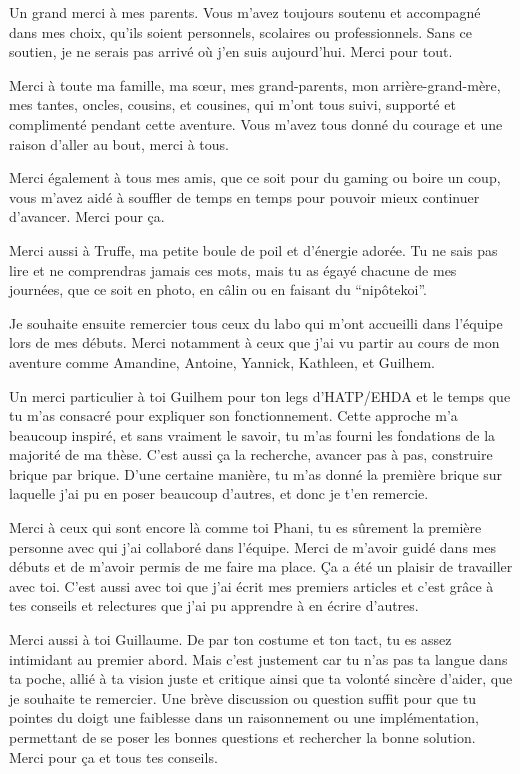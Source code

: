
Un grand merci à mes parents. Vous m'avez toujours soutenu et accompagné dans mes choix, qu'ils soient personnels, scolaires ou professionnels. Sans ce soutien, je ne serais pas arrivé où j'en suis aujourd'hui. Merci pour tout.

Merci à toute ma famille, ma sœur, mes grand-parents, mon arrière-grand-mère, mes tantes, oncles, cousins, et cousines, qui m'ont tous suivi, supporté et complimenté pendant cette aventure. Vous m'avez tous donné du courage et une raison d'aller au bout, merci à tous.

Merci également à tous mes amis, que ce soit pour du gaming ou boire un coup, vous m'avez aidé à souffler de temps en temps pour pouvoir mieux continuer d'avancer. Merci pour ça.



Merci aussi à Truffe, ma petite boule de poil et d'énergie adorée. Tu ne sais pas lire et ne comprendras jamais ces mots, mais tu as égayé chacune de mes journées, que ce soit en photo, en câlin ou en faisant du ``nipôtekoi''.



Je souhaite ensuite remercier tous ceux du labo qui m'ont accueilli dans l'équipe lors de mes débuts. Merci notamment à ceux que j'ai vu partir au cours de mon aventure comme Amandine, Antoine, Yannick, Kathleen, et Guilhem.

Un merci particulier à toi Guilhem pour ton legs d'HATP/EHDA et le temps que tu m'as consacré pour expliquer son fonctionnement. 
Cette approche m'a beaucoup inspiré, et sans vraiment le savoir, tu m'as fourni les fondations de la majorité de ma thèse. C'est aussi ça la recherche, avancer pas à pas, construire brique par brique. D'une certaine manière, tu m'as donné la première brique sur laquelle j'ai pu en poser beaucoup d'autres, et donc je t'en remercie.

Merci à ceux qui sont encore là comme toi Phani, tu es sûrement la première personne avec qui j'ai collaboré dans l'équipe. Merci de m'avoir guidé dans mes débuts et de m'avoir permis de me faire ma place. Ça a été un plaisir de travailler avec toi. C'est aussi avec toi que j'ai écrit mes premiers articles et c'est grâce à tes conseils et relectures que j'ai pu apprendre à en écrire d'autres.

Merci aussi à toi Guillaume. 
De par ton costume et ton tact, tu es assez intimidant au premier abord. 
Mais c'est justement car tu n'as pas ta langue dans ta poche, allié à ta vision juste et critique ainsi que ta volonté sincère d'aider, que je souhaite te remercier. Une brève discussion ou question suffit pour que tu pointes du doigt une faiblesse dans un raisonnement ou une implémentation, permettant de se poser les bonnes questions et rechercher la bonne solution. Merci pour ça et tous tes conseils.



